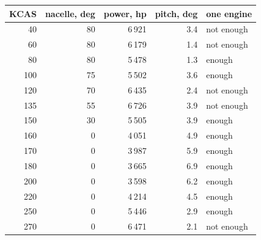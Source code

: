 \begin{tabular}{@{}rrrrl@{}}
\toprule
KCAS & nacelle, deg & power, hp & pitch, deg & one engine \\
\midrule
40 & 80 & 6\,921 & 3.4 & not enough \\
60 & 80 & 6\,179 & 1.4 & not enough \\
80 & 80 & 5\,478 & 1.3 & enough \\
100 & 75 & 5\,502 & 3.6 & enough \\
120 & 70 & 6\,435 & 2.4 & not enough \\
135 & 55 & 6\,726 & 3.9 & not enough \\
150 & 30 & 5\,505 & 3.9 & enough \\
160 & 0 & 4\,051 & 4.9 & enough \\
170 & 0 & 3\,987 & 5.9 & enough \\
180 & 0 & 3\,665 & 6.9 & enough \\
200 & 0 & 3\,598 & 6.2 & enough \\
220 & 0 & 4\,214 & 4.5 & enough \\
250 & 0 & 5\,446 & 2.9 & enough \\
270 & 0 & 6\,471 & 2.1 & not enough \\
\bottomrule
\end{tabular}
